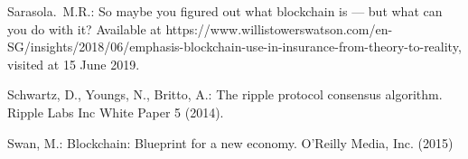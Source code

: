 \documentclass{KERauth}
\begin{document}
\begin{thebibliography}
\item Sarasola.~M.R.: So maybe you figured out what blockchain is — but what can you do with it? Available at https://www.willistowerswatson.com/en-SG/insights/2018/06/emphasis-blockchain-use-in-insurance-from-theory-to-reality, visited at 15 June 2019.

\item Schwartz, D., Youngs, N., Britto, A.: The ripple protocol consensus algorithm.
Ripple Labs Inc White Paper 5 (2014).

\item Swan, M.: Blockchain: Blueprint for a new economy. O’Reilly Media, Inc. (2015)

\end{thebibliography}
\end{document}
